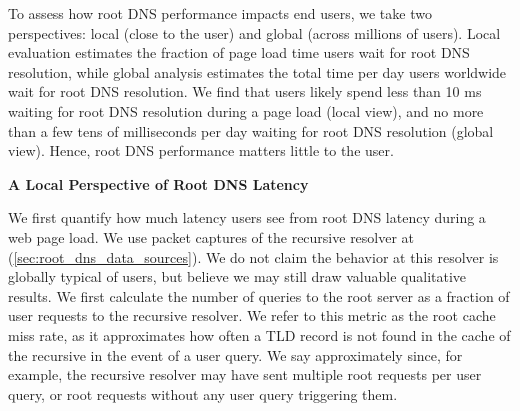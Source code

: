 \documentclass[sigconf,letterpaper,nonacm,10pt,anonymous]{acmart}
\begin{document}
\label{sec:root_dns_latency} To assess how root DNS performance impacts
end users, we take two perspectives: local (close to the user) and
global (across millions of users). Local evaluation estimates the
fraction of page load time users wait for root DNS resolution, while
global analysis estimates the total time per day users worldwide wait
for root DNS resolution. We find that users likely spend less than 10 ms
waiting for root DNS resolution during a page load (local view), and no
more than a few tens of milliseconds per day waiting for root DNS
resolution (global view). Hence, root DNS performance matters little to
the user.

\textbf{A Local Perspective of Root DNS Latency}

We first quantify how much latency users see from root DNS latency
during a web page load. We use packet captures of the recursive resolver
at \ISIthree (\cref{sec:root_dns_data_sources}). We do not claim the
behavior at this resolver is globally typical of users, but believe we
may still draw valuable qualitative results. We first calculate the
number of queries to the root server as a fraction of user requests to
the recursive resolver. We refer to this metric as the root cache miss
rate, as it approximates how often a TLD record is not found in the
cache of the recursive in the event of a user query. We say
approximately since, for example, the recursive resolver may have sent
multiple root requests per user query, or root requests without any user
query triggering them.
\end{document}
